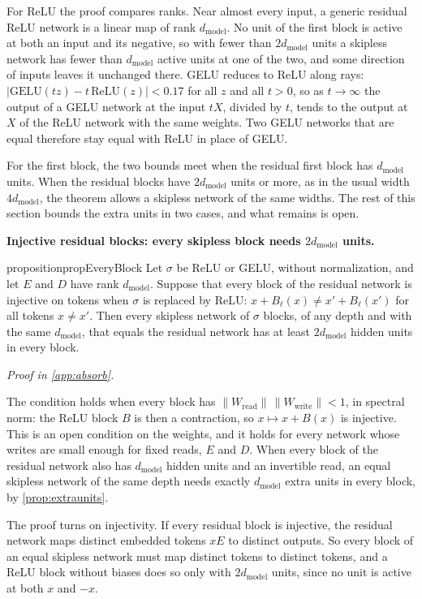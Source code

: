 \documentclass[10pt]{article}
\theoremstyle{definition}
\theoremstyle{remark}
\newcommand{\Wread}{W_{\mathrm{read}}}
\newcommand{\Wwrite}{W_{\mathrm{write}}}
\newcommand{\dm}{d_{\mathrm{model}}}
\newcommand{\norm}[1]{\lVert #1\rVert}
\newcommand{\para}[1]{\smallskip\noindent\textbf{#1}\hspace{0.5em}}
\newcommand{\proofin}[1]{\par\vspace{-0.4\baselineskip}\noindent\hfill{\small\itshape Proof in \cref{#1}.}\par\smallskip}
\begin{document}
For ReLU the proof compares ranks. Near almost every input, a generic residual ReLU network is a linear map of rank $\dm$. No unit of the first block is active at both an input and its negative, so with fewer than $2\dm$ units a skipless network has fewer than $\dm$ active units at one of the two, and some direction of inputs leaves it unchanged there. GELU reduces to ReLU along rays: $\lvert\mathrm{GELU}(tz) - t\,\mathrm{ReLU}(z)\rvert < 0.17$ for all $z$ and all $t > 0$, so as $t \to \infty$ the output of a GELU network at the input $tX$, divided by $t$, tends to the output at $X$ of the ReLU network with the same weights. Two GELU networks that are equal therefore stay equal with ReLU in place of GELU.

For the first block, the two bounds meet when the residual first block has $\dm$ units. When the residual blocks have $2\dm$ units or more, as in the usual width $4\dm$, the theorem allows a skipless network of the same widths. The rest of this section bounds the extra units in two cases, and what remains is open.

\para{Injective residual blocks: every skipless block needs $2\dm$ units.}

\begin{restatable}[Injective blocks: $2\dm$ units in every block]{proposition}{propEveryBlock}\label{prop:everyblock}
Let $\sigma$ be ReLU or GELU, without normalization, and let $E$ and $D$ have rank $\dm$. Suppose that every block of the residual network is injective on tokens when $\sigma$ is replaced by ReLU: $x + B_\ell(x) \neq x' + B_\ell(x')$ for all tokens $x \neq x'$. Then every skipless network of $\sigma$ blocks, of any depth and with the same $\dm$, that equals the residual network has at least $2\dm$ hidden units in every block.
\end{restatable}
\proofin{app:absorb}

The condition holds when every block has $\norm{\Wread}\,\norm{\Wwrite} < 1$, in spectral norm: the ReLU block $B$ is then a contraction, so $x \mapsto x + B(x)$ is injective. This is an open condition on the weights, and it holds for every network whose writes are small enough for fixed reads, $E$ and $D$. When every block of the residual network also has $\dm$ hidden units and an invertible read, an equal skipless network of the same depth needs exactly $\dm$ extra units in every block, by \cref{prop:extraunits}.

The proof turns on injectivity. If every residual block is injective, the residual network maps distinct embedded tokens $xE$ to distinct outputs. So every block of an equal skipless network must map distinct tokens to distinct tokens, and a ReLU block without biases does so only with $2\dm$ units, since no unit is active at both $x$ and $-x$.
\end{document}
